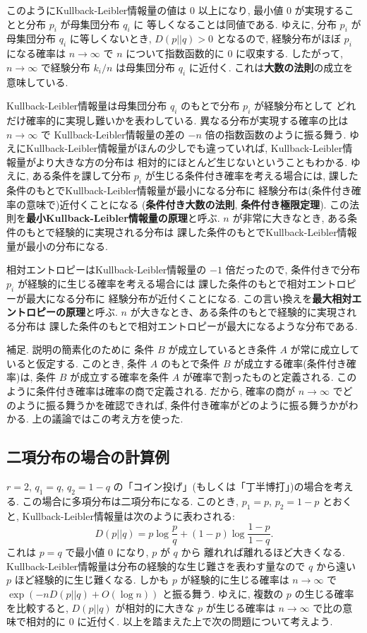 \documentclass[12pt,twoside]{jarticle}
\theoremstyle{jplain}
\theoremstyle{jplain}
\theoremstyle{jplain}
\numberwithin{theorem}{section}
\numberwithin{equation}{section}
\numberwithin{figure}{section}
\numberwithin{table}{section}
\begin{document}
このようにKullback-Leibler情報量の値は $0$ 以上になり, 
最小値 $0$ が実現することと分布 $p_i$ が母集団分布 $q_i$ に
等しくなることは同値である.
ゆえに, 分布 $p_i$ が母集団分布 $q_i$ に等しくないとき, 
$D(p||q)>0$ となるので, 
経験分布がほぼ $p_i$ になる確率は $n\to\infty$ で
$n$ について指数函数的に $0$ に収束する.
したがって, $n\to\infty$ で経験分布 $k_i/n$ は母集団分布 $q_i$ に近付く.
これは{\bf 大数の法則}の成立を意味している.

Kullback-Leibler情報量は母集団分布 $q_i$ のもとで分布 $p_i$ が経験分布として
どれだけ確率的に実現し難いかを表わしている.
異なる分布が実現する確率の比は $n\to\infty$ で
Kullback-Leibler情報量の差の $-n$ 倍の指数函数のように振る舞う.
ゆえにKullback-Leibler情報量がほんの少しでも違っていれば, 
Kullback-Leibler情報量がより大きな方の分布は
相対的にほとんど生じないということもわかる.
ゆえに, ある条件を課して分布 $p_i$ が生じる条件付き確率を考える場合には, 
課した条件のもとでKullback-Leibler情報量が最小になる分布に
経験分布は(条件付き確率の意味で)近付くことになる
({\bf 条件付き大数の法則}, {\bf 条件付き極限定理}).
この法則を{\bf 最小Kullback-Leibler情報量の原理}と呼ぶ.
$n$ が非常に大きなとき, ある条件のもとで経験的に実現される分布は
課した条件のもとでKullback-Leibler情報量が最小の分布になる.

相対エントロピーはKullback-Leibler情報量の $-1$ 倍だったので,
条件付きで分布 $p_i$ が経験的に生じる確率を考える場合には
課した条件のもとで相対エントロピーが最大になる分布に
経験分布が近付くことになる.
この言い換えを{\bf 最大相対エントロピーの原理}と呼ぶ.
$n$ が大きなとき、ある条件のもとで経験的に実現される分布は
課した条件のもとで相対エントロピーが最大になるような分布である.

補足. 説明の簡素化のために
条件 $B$ が成立しているとき条件 $A$ が常に成立していると仮定する.
このとき, 条件 $A$ のもとで条件 $B$ が成立する確率(条件付き確率)は, 
条件 $B$ が成立する確率を条件 $A$ が確率で割ったものと定義される.
このように条件付き確率は確率の商で定義される.
だから, 確率の商が $n\to\infty$ でどのように振る舞うかを確認できれば,
条件付き確率がどのように振る舞うかがわかる. 
上の議論ではこの考え方を使った.


\subsection{二項分布の場合の計算例}
\label{sec:binom-Sanov}

$r=2$, $q_1=q$, $q_2=1-q$ の「コイン投げ」(もしくは「丁半博打」)の場合を考える.
この場合に多項分布は二項分布になる.
このとき, $p_1=p$, $p_2=1-p$ とおくと, 
Kullback-Leibler情報量は次のように表わされる:
\[
D(p||q)=p\log \frac{p}{q}+(1-p)\log\frac{1-p}{1-q}. 
\]
これは $p=q$ で最小値 $0$ になり, $p$ が $q$ から
離れれば離れるほど大きくなる.
Kullback-Leibler情報量は分布の経験的な生じ難さを表わす量なので
$q$ から遠い $p$ ほど経験的に生じ難くなる.
しかも $p$ が経験的に生じる確率は $n\to\infty$ で
$\exp(-nD(p||q)+O(\log n))$ と振る舞う.
ゆえに, 複数の $p$ の生じる確率を比較すると, 
$D(p||q)$ が相対的に大きな $p$ が生じる確率は
$n\to\infty$ で比の意味で相対的に $0$ に近付く. 
以上を踏まえた上で次の問題について考えよう.
\end{document}
